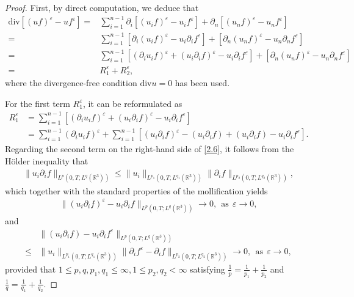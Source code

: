 \documentclass[11pt]{article}
\theoremstyle{plain}\newtheorem{definition}{Definition}[section]
\theoremstyle{definition}\newtheorem{theorem}{Theorem}[section]
\theoremstyle{plain}\newtheorem{lemma}[theorem]{Lemma}
\theoremstyle{plain}\newtheorem{coro}[theorem]{Corollary}
\theoremstyle{plain}\newtheorem{prop}[theorem]{Proposition}
\theoremstyle{remark}\newtheorem{remark}{Remark}[section]
\newcommand{\s}{\mathrm{div}}
\newcommand{\be}{\begin{equation}}
\newcommand{\ee}{\end{equation}}
\newcommand{\ba}{\begin{aligned}}
\newcommand{\ea}{\end{aligned}}
\newcommand{\f}{\frac}
\numberwithin{equation}{section}
\begin{document}
\begin{proof}
First, by direct computation, we deduce that
	\be\label{2.5}\ba \s[(uf)^\varepsilon  -   u  f^\varepsilon   ]  =&  \sum_{i=1}^{  n-1}\partial_{i}[(u_{i}f)^\varepsilon  -   u_{i}  f^\varepsilon   ] +\partial_{n}[(u_{n}f)^\varepsilon  -   u_{n}  f^\varepsilon   ]\\ = & \sum_{i=1}^{  n-1}[\partial_{i}(u_{i}f)^\varepsilon  -   u_{i}  \partial_{i}f^\varepsilon   ] +[\partial_{n}(u_{n}f)^\varepsilon  -   u_{n}\partial_{n}  f^\varepsilon   ]\\ = & \sum_{i=1}^{  n-1}[(\partial_{i}u_{i}f)^\varepsilon + (u_{i}\partial_{i}f)^\varepsilon-   u_{i}  \partial_{i}f^\varepsilon   ] +[\partial_{n}(u_{n}f)^\varepsilon  -   u_{n}\partial_{n}  f^\varepsilon   ]\\
	=&R_1^\varepsilon +R_2^\varepsilon,\ea\ee
	where the divergence-free condition $\s u=0$ has been used.
	
	For the first term $R_1^\varepsilon$, it can be reformulated as
	\be\label{2.6}
	\ba
	R_1^\varepsilon&=\sum_{i=1}^{  n-1}[(\partial_{i}u_{i}f)^\varepsilon + (u_{i}\partial_{i}f)^\varepsilon-   u_{i}  \partial_{i}f^\varepsilon   ]\\
	&=\sum_{i=1}^{  n-1}(\partial_i u_i f)^\varepsilon+ \sum_{i=1}^{  n-1}[(u_i \partial_i f)^\varepsilon -(u_i \partial_i f)+(u_i \partial_i f)-u_i \partial_i f^\varepsilon].
		\ea\ee
Regarding the second term on the right-hand side of \eqref{2.6}, it follows from the H\"older inequality that
\be\label{2.7}\ba
\|u_i \partial_i f\|_{L^p(0,T;L^q(\mathbb{R}^3))}\leq \|u_i\|_{L^{p_1}(0,T;L^{q_1}(\mathbb{R}^3))}\|\partial_i f\|_{L^{p_2}(0,T;L^{q_2}(\mathbb{R}^3))},
\ea\ee
which together with the standard properties of the mollification yields
\be\label{2.8}\ba
\|(u_i \partial_i f)^\varepsilon - u_i \partial_i f\|_{L^p(0,T;L^q(\mathbb{R}^3))}\rightarrow 0,~~\text{as}~~\varepsilon \to 0,
 \ea\ee	
and
\be\label{2.9}\ba
&\|(u_i \partial_i f)-u_i \partial_i f^\varepsilon\|_{L^p(0,T;L^q(\mathbb{R}^3))}\\
\leq& \|u_i\|_{L^{p_1}(0,T;L^{q_1}(\mathbb{R}^3))}\|\partial_i f^\varepsilon -\partial_i f\|_{L^{p_2}(0,T;L^{q_2}(\mathbb{R}^3))}\to 0, ~~\text{as}~~\varepsilon \to 0,
\ea\ee
provided that $1\leq p,q, p_1, q_1\leq \infty, 1\leq p_2,q_2<\infty$ satisfying $\f1p=\frac{1}{p_1}+\frac{1}{p_2}$ and $\frac{1}{q}=\frac{1}{q_1}+\frac{1}{q_2}$.


\end{proof}
\end{document}
